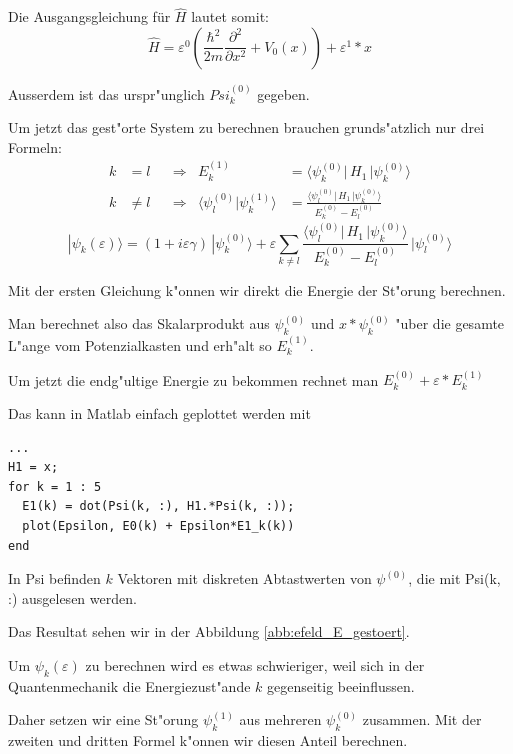 \begin{refsection}
Die Ausgangsgleichung f\"ur $\hat{H}$ lautet somit:
\[
  \hat{H} = \varepsilon^0 ( \frac{\hbar^2}{2m} \frac{\partial^2}{\partial x^2} + V_0(x) )
            + \varepsilon^1*x
\]

Ausserdem ist das urspr"unglich $Psi_k^{(0)}$ gegeben.

Um jetzt das gest"orte System zu berechnen brauchen grunds"atzlich nur drei Formeln:
\begin{equation}
\begin{aligned}
k&=l
&&\Rightarrow&
E_k^{(1)}
&=
\langle \psi_k^{(0)}|\, H_1 \,|\psi_k^{(0)}\rangle
\\
k&\ne l
&&\Rightarrow&
\langle\psi_l^{(0)}|\psi_k^{(1)}\rangle
&=
\frac{\langle \psi_l^{(0)}|\, H_1 \,|\psi_k^{(0)}\rangle}{E_k^{(0)}-E_l^{(0)}}
\end{aligned}
\end{equation}
\begin{equation}
|\psi_k(\varepsilon)\rangle
=
(1+i\varepsilon \gamma)
\,|\psi_k^{(0)}\rangle
+
\varepsilon
\sum_{k\ne l}
\frac{\langle \psi_l^{(0)}|\, H_1 \,|\psi_k^{(0)}\rangle}{E_k^{(0)}-E_l^{(0)}}
\,
|\psi_l^{(0)}\rangle
\end{equation}

Mit der ersten Gleichung k"onnen wir direkt die Energie der St"orung berechnen.

Man berechnet also das Skalarprodukt aus $\psi_k^{(0)}$ und $x*\psi_k^{(0)}$ "uber die gesamte L"ange vom Potenzialkasten und erh"alt so $E_k^{(1)}$.

Um jetzt die endg"ultige Energie zu bekommen rechnet man $E_k^{(0)} + \varepsilon*E_k^{(1)}$

Das kann in Matlab einfach geplottet werden mit
\begin{lstlisting}[style=Matlab]
...
H1 = x;
for k = 1 : 5
  E1(k) = dot(Psi(k, :), H1.*Psi(k, :));
  plot(Epsilon, E0(k) + Epsilon*E1_k(k))
end
\end{lstlisting}
In Psi befinden $k$ Vektoren mit diskreten Abtastwerten von $\psi^{(0)}$, die mit Psi(k, :) ausgelesen werden.

Das Resultat sehen wir in der Abbildung \ref{abb:efeld_E_gestoert}.

Um $\psi_k(\varepsilon)$ zu berechnen wird es etwas schwieriger, weil sich in der Quantenmechanik die Energiezust"ande $k$ gegenseitig beeinflussen.

Daher setzen wir eine St"orung $\psi_k^{(1)}$ aus mehreren $\psi_k^{(0)}$ zusammen.
Mit der zweiten und dritten Formel k"onnen wir diesen Anteil berechnen.


\end{refsection}

